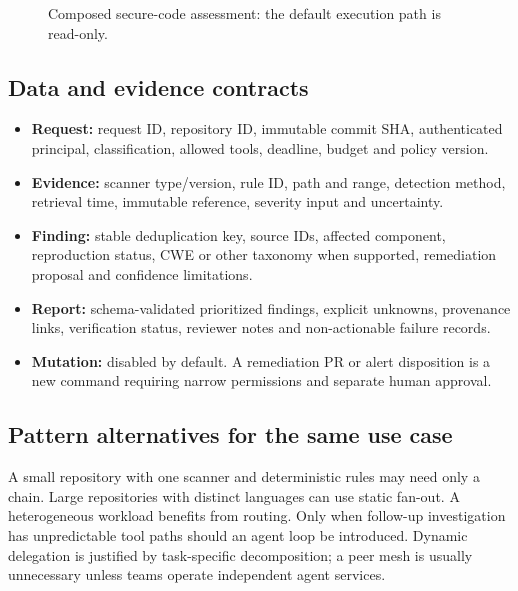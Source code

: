 \begin{figure}[htbp]\centering
{}
\caption{Composed secure-code assessment: the default execution path is read-only.}
\label{fig:appsec}
\end{figure}

\subsection{Data and evidence contracts}
\begin{itemize}
\item \textbf{Request:} request ID, repository ID, immutable commit SHA, authenticated principal, classification, allowed tools, deadline, budget and policy version.
\item \textbf{Evidence:} scanner type/version, rule ID, path and range, detection method, retrieval time, immutable reference, severity input and uncertainty.
\item \textbf{Finding:} stable deduplication key, source IDs, affected component, reproduction status, CWE or other taxonomy when supported, remediation proposal and confidence limitations.
\item \textbf{Report:} schema-validated prioritized findings, explicit unknowns, provenance links, verification status, reviewer notes and non-actionable failure records.
\item \textbf{Mutation:} disabled by default. A remediation PR or alert disposition is a new command requiring narrow permissions and separate human approval.
\end{itemize}

\subsection{Pattern alternatives for the same use case}
A small repository with one scanner and deterministic rules may need only a chain. Large repositories with distinct languages can use static fan-out. A heterogeneous workload benefits from routing. Only when follow-up investigation has unpredictable tool paths should an agent loop be introduced. Dynamic delegation is justified by task-specific decomposition; a peer mesh is usually unnecessary unless teams operate independent agent services.

